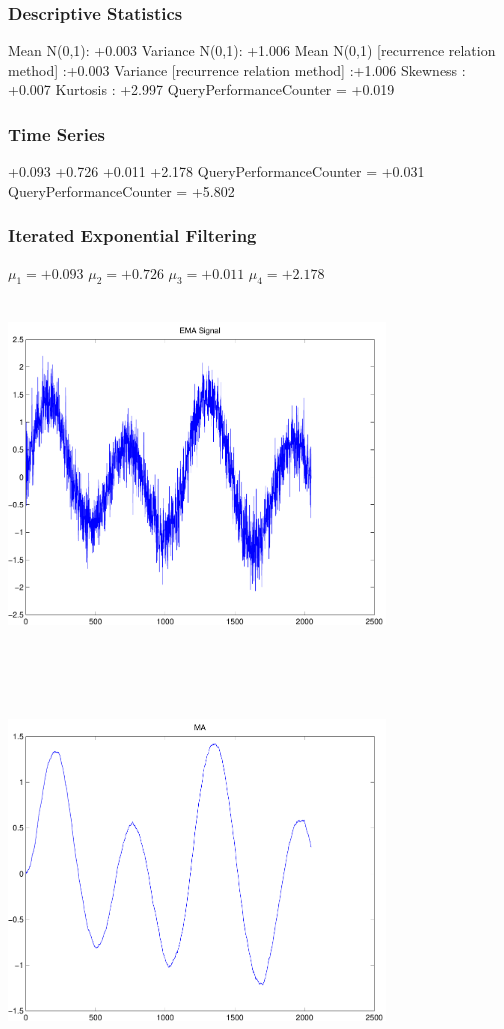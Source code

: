 \documentclass[9pt]{article}
\theoremstyle{plain}
\theoremstyle{definition}
\theoremstyle{remark}
\numberwithin{equation}{section}
\begin{document}
\subsubsection{Descriptive Statistics}
Mean N(0,1): +0.003
Variance N(0,1): +1.006
Mean N(0,1) [recurrence relation method] :+0.003
Variance [recurrence relation method] :+1.006
Skewness : +0.007
Kurtosis : +2.997
QueryPerformanceCounter  =  +0.019
\subsubsection{Time Series }
+0.093
+0.726
+0.011
+2.178
QueryPerformanceCounter  =  +0.031
QueryPerformanceCounter  =  +5.802
\subsubsection{Iterated Exponential Filtering }
$\mu_1 =+0.093$
$\mu_2 =+0.726$
$\mu_3 =+0.011$
$\mu_4 =+2.178$
\includegraphics[width=10.0cm,height=10.0cm]{EMA_signal.pdf}

\includegraphics[width=10.0cm,height=10.0cm]{MA.pdf}
\end{document}
